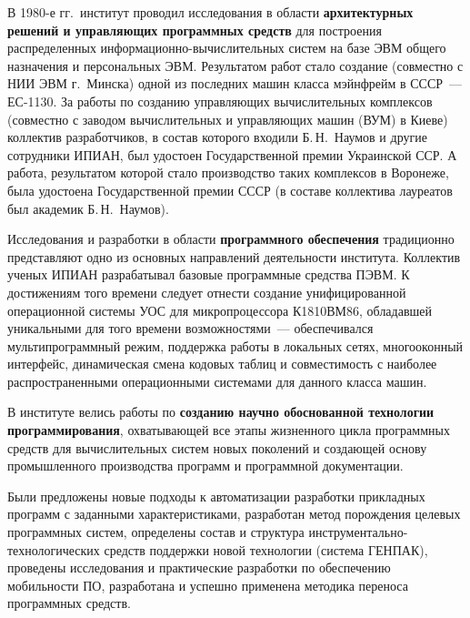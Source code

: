 \begin{multicols}{2}
{}

     В 1980-е гг.\ институт проводил исследования в области
\textbf{архитектурных решений и управляющих программных
средств} для построения распределенных
     ин\-фор\-ма\-ци\-он\-но-вы\-чис\-ли\-тель\-ных систем на базе ЭВМ общего
назначения и персональных ЭВМ. Результатом работ стало создание
(совместно с НИИ ЭВМ г.~Минска) одной из последних машин
класса мэйнфрейм в СССР~--- ЕС-1130. За работы по созданию
управляющих вычислительных комплексов (совместно с заводом
вы\-чис\-ли\-тель\-ных и управ\-ля\-ющих машин (ВУМ) в Киеве) коллектив разработчиков, в состав которого входили
Б.\,Н.~Наумов и другие сотрудники ИПИАН, был удос\-то\-ен
Государственной премии Украинской ССР. А работа, результатом
которой стало производство таких комплексов в Воронеже, была
удостоена Государственной премии СССР (в составе коллектива
лауреатов был академик Б.\,Н.~Наумов).

     Исследования и разработки в области \textbf{про\-грам\-мно\-го
обеспечения} традиционно представляют одно из основных
направлений деятельности института. Коллектив ученых ИПИАН
разрабатывал базовые программные средства ПЭВМ. К
достижениям того времени следует отнести создание
унифицированной операционной системы УОС для
микропроцессора К1810ВМ86, обладавшей уникальными для того
времени возможностями~--- обеспечивался мультипрограммный
режим, поддержка работы в локальных сетях, многооконный
интерфейс, динамическая смена кодовых таблиц и совместимость с
наиболее распространенными операционными сис\-те\-ма\-ми для
данного класса машин.

     В институте велись работы по \textbf{созданию научно
обоснованной технологии программирования}, охватывающей
все этапы жизненного цикла про\-грам\-мных средств для
вычислительных систем новых поколений и создающей основу
промышленного производства программ и программной %
до\-ку\-мен\-тации. 

Были предложены новые подходы к ав\-то\-ма\-ти\-за\-ции
разработки прикладных программ с за\-дан\-ны\-ми характеристиками,
разработан метод по\-рож\-де\-ния целевых программных сис\-тем,
определены со\-став и структура инстру\-мен\-таль\-но-тех\-но\-ло\-ги\-че\-ских
средств поддержки новой технологии %
(сис\-те\-ма ГЕНПАК),
проведены исследования и практические разработки по
обеспечению мобильности ПО, разработана и успешно применена
методика переноса программных средств.
{

}
\end{multicols}
